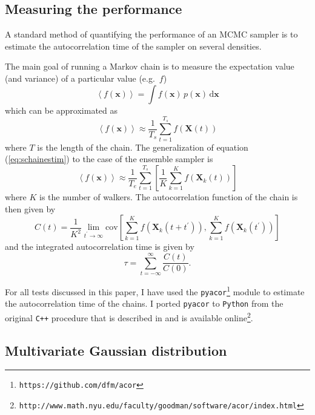\documentclass[12pt,preprint]{aastex}
\newcommand{\project}[1]{\texttt{#1}}
\newcommand{\eq}[1]{equation (\ref{eq:#1})}
\newcommand{\eqlabel}[1]{\label{eq:#1}}
\newcommand{\dd}{\mathrm{d}}
\begin{document}
\subsection{Measuring the performance}

A standard method of quantifying the performance of an MCMC sampler is to estimate
the autocorrelation time of the sampler on several densities.

The main goal of running a Markov chain is to measure the expectation value (and
variance) of a particular value (e.g.~$f$)
\begin{equation}
    \left < f(\mathbf{x}) \right > = \int f(\mathbf{x}) \, p (\mathbf{x}) \, \dd \mathbf{x}
\end{equation}
which can be approximated as
\begin{equation}
    \eqlabel{schainestim}
    \left < f(\mathbf{x}) \right > \approx \frac{1}{T_s} \sum_{t=1}^{T_s} f(\mathbf{X}(t))
\end{equation}
where $T$ is the length of the chain.  The generalization of \eq{schainestim} to
the case of the ensemble sampler is
\begin{equation}
    \eqlabel{echainestim}
    \left < f(\mathbf{x}) \right > \approx \frac{1}{T_e} \sum_{t=1}^{T_s} \left [ \frac{1}{K} \sum_{k = 1}^{K} f(\mathbf{X}_k(t)) \right ]
\end{equation}
where $K$ is the number of walkers.  The autocorrelation function of the chain is
then given by
\begin{equation}
    C (t) = \frac{1}{K^2} \lim_{t^\prime \to \infty} \mathrm{cov} \left [ \sum_{k = 1}^{K} f(\mathbf{X}_k (t+t^\prime)),
         \sum_{k = 1}^{K} f(\mathbf{X}_k (t^\prime)) \right ]
\end{equation}
and the integrated autocorrelation time is given by
\begin{equation}
    \tau = \sum_{t= -\infty} ^{\infty} \frac{C(t)}{C(0)} .
\end{equation}

For all tests discussed in this paper, I have used the \project{pyacor}\footnote{\texttt{https://github.com/dfm/acor}}
module to estimate the autocorrelation time of the chains. I ported \project{pyacor} to \project{Python}
from the original \project{C++} procedure that is described in \citet{Goodman:2010} and
is available online\footnote{\texttt{http://www.math.nyu.edu/faculty/goodman/software/acor/index.html}}.


\subsection{Multivariate Gaussian distribution}
\end{document}
